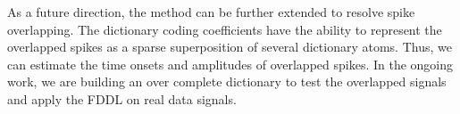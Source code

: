 \documentclass[conference]{IEEEtran}
\begin{document}
	As a future direction, the method can be further extended to resolve spike overlapping. The dictionary coding coefficients have the ability to represent the overlapped spikes as a sparse superposition of several dictionary atoms. Thus, we can estimate the time onsets and amplitudes of overlapped spikes. In the ongoing work, we are building an over complete dictionary to test the overlapped signals and apply the FDDL on real data signals.
	
\end{document}
